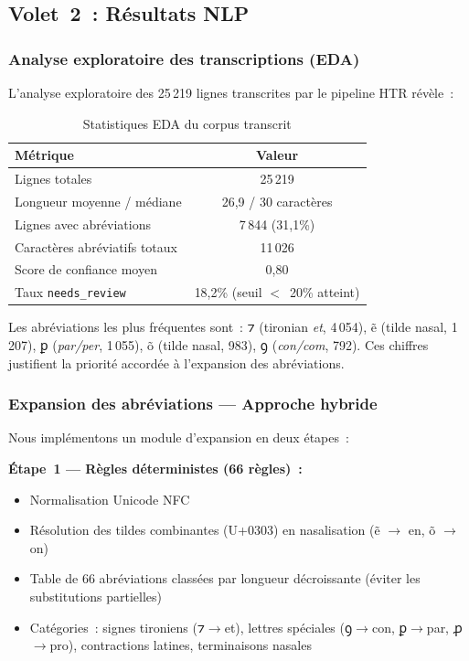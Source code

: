 \documentclass[11pt,a4paper]{article}
\begin{document}
\subsection{Volet~2~: Résultats NLP}

\subsubsection{Analyse exploratoire des transcriptions (EDA)}

L'analyse exploratoire des 25\,219 lignes transcrites par le pipeline HTR révèle~:

\begin{table}[H]
\centering
\caption{Statistiques EDA du corpus transcrit}
\label{tab:eda}
\begin{tabular}{@{}lc@{}}
\toprule
\textbf{Métrique} & \textbf{Valeur} \\
\midrule
Lignes totales & 25\,219 \\
Longueur moyenne / médiane & 26,9 / 30 caractères \\
Lignes avec abréviations & 7\,844 (31,1\%) \\
Caractères abréviatifs totaux & 11\,026 \\
Score de confiance moyen & 0,80 \\
Taux \texttt{needs\_review} & 18,2\% (seuil $<$~20\% atteint) \\
\bottomrule
\end{tabular}
\end{table}

Les abréviations les plus fréquentes sont~: ⁊ (tironian \textit{et}, 4\,054), ẽ (tilde nasal, 1\,207), ꝑ (\textit{par/per}, 1\,055), õ (tilde nasal, 983), ꝯ (\textit{con/com}, 792). Ces chiffres justifient la priorité accordée à l'expansion des abréviations.

\subsubsection{Expansion des abréviations --- Approche hybride}

Nous implémentons un module d'expansion en deux étapes~:

\textbf{Étape~1 --- Règles déterministes (66 règles)~:}
\begin{itemize}[leftmargin=*, itemsep=1pt]
\item Normalisation Unicode NFC
\item Résolution des tildes combinantes (U+0303) en nasalisation (ẽ $\rightarrow$ en, õ $\rightarrow$ on)
\item Table de 66 abréviations classées par longueur décroissante (éviter les substitutions partielles)
\item Catégories~: signes tironiens (⁊$\rightarrow$et), lettres spéciales (ꝯ$\rightarrow$con, ꝑ$\rightarrow$par, ꝓ$\rightarrow$pro), contractions latines, terminaisons nasales
\end{itemize}
\end{document}
